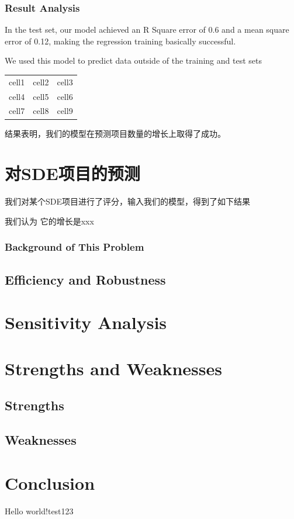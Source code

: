 \documentclass[a4paper]{article}
\begin{document}
\subsubsection{Result Analysis}
In the test set, our model achieved an R Square error of 0.6 and a mean square error of 0.12, making the regression training basically successful.

We used this model to predict data outside of the training and test sets

\begin{center}
    \begin{tabular}{ c c c }
     cell1 & cell2 & cell3 \\ 
     cell4 & cell5 & cell6 \\  
     cell7 & cell8 & cell9    
    \end{tabular}
    \end{center}

结果表明，我们的模型在预测项目数量的增长上取得了成功。



\section{对SDE项目的预测}
我们对某个SDE项目进行了评分，输入我们的模型，得到了如下结果

我们认为 它的增长是xxx
\subsubsection{Background of This Problem}
\subsection{Efficiency and Robustness}
\section{Sensitivity Analysis}
\section{Strengths and Weaknesses}
\subsection{Strengths}
\subsection{Weaknesses}
\section{Conclusion}
Hello world!test123
\end{document}
